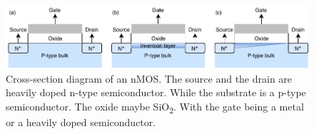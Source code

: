 \documentclass[11pt,a4paper]{report}
\begin{document}
\begin{figure}
    \centering
    \includegraphics[width = \textwidth]{Figures/MOSFET.pdf}
    \caption{Cross-section diagram of an nMOS. The source and the drain are heavily doped n-type semiconductor. While the substrate is a p-type semiconductor. The oxide maybe SiO\textsubscript{2}. With the gate being a metal or a heavily doped semiconductor.}
    \label{fig:MOSFET_Cross-Section}
\end{figure}

\begin{figure}
\begin{minipage}{.5\linewidth}
\centering
{}
\end{minipage}
\begin{minipage}{.5\linewidth}
\centering
{}

\end{minipage}
\end{figure}
\end{document}
